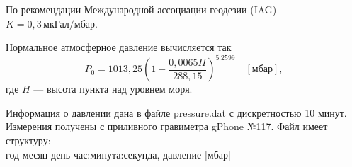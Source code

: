 \documentclass[11pt, a4paper,addpoints]{exam}
\theoremstyle{remark}
\begin{document}
По рекомендации Международной ассоциации геодезии (IAG) $K = 0,3\, \text{мкГал/мбар}$.

Нормальное атмосферное давление вычисляется так
\begin{equation*}
    P_0 = 1013,25 \left( 1 - \dfrac{0,0065 H}{288,15} \right)^{5.2599}\quad[\text{мбар}],
\end{equation*}
где $H$ --- высота пункта над уровнем моря.

Информация о давлении дана в файле \textrm{pressure.dat} с дискретностью 10 минут. Измерения
получены с приливного гравиметра gPhone №117. Файл имеет структуру:\\
год-месяц-день час:минута:секунда, давление [мбар]\\

\end{document}
